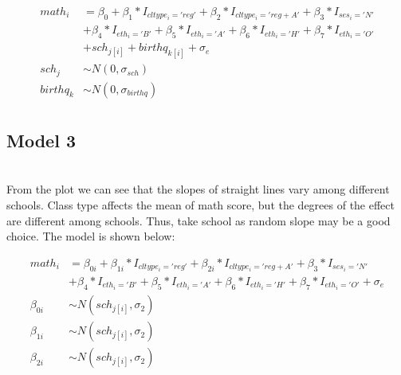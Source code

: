 \documentclass[11pt,a4paper]{article}
\begin{document}
\begin{align*}
    math_i &= \beta_0 + \beta_1*I_{cltype_i='reg'} + \beta_2*I_{cltype_i='reg+A'} + \beta_3*I_{ses_i='N'} \\
    &+ \beta_4*I_{eth_i='B'} + \beta_5*I_{eth_i='A'} + \beta_6*I_{eth_i='H'} + \beta_7*I_{eth_i='O'} \\ 
    &+ sch_{j[i]} + birthq_{k[i]} + \sigma_e\\
    sch_j &\sim N(0, \sigma_{sch})\\
    birthq_k &\sim N(0, \sigma_{birthq})\\
\end{align*}

\subsection{Model 3}

\begin{minipage}{\linewidth}
    \label{fig:random slope}
\end{minipage}\\

From the plot we can see that the slopes of straight lines vary among different schools. Class type affects the mean of math score, 
but the degrees of the effect are different among schools. Thus, take school as random slope may be a good choice. The model is shown below:

\begin{align*}
    math_i &= \beta_{0i} + \beta_{1i}*I_{cltype_i='reg'} + \beta_{2i}*I_{cltype_i='reg+A'} + \beta_3*I_{ses_i='N'} \\
    &+ \beta_4*I_{eth_i='B'} + \beta_5*I_{eth_i='A'} + \beta_6*I_{eth_i='H'} + \beta_7*I_{eth_i='O'} + \sigma_e\\
    \beta_{0i} &\sim N(sch_{j[i]}, \sigma_2)\\
    \beta_{1i} &\sim N(sch_{j[i]}, \sigma_2)\\
    \beta_{2i} &\sim N(sch_{j[i]}, \sigma_2)\\
\end{align*}
\end{document}
